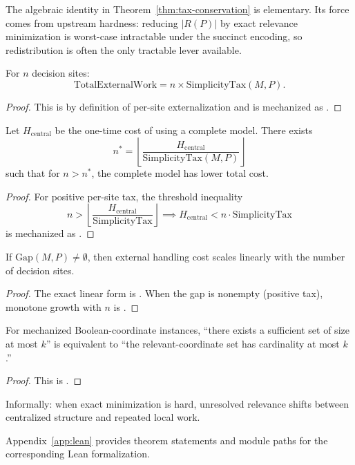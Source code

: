\begin{remark}
The algebraic identity in Theorem~\ref{thm:tax-conservation} is elementary. Its force comes from upstream hardness: reducing $|R(P)|$ by exact relevance minimization is worst-case intractable under the succinct encoding, so redistribution is often the only tractable lever available.
\end{remark}

\begin{theorem}\label{thm:tax-grows}
For $n$ decision sites:
\[
\text{TotalExternalWork} = n \times \text{SimplicityTax}(M, P).
\]
\end{theorem}

\begin{proof}
This is by definition of per-site externalization and is mechanized as
.
\end{proof}

\begin{theorem}[Amortization]\label{thm:amortization}
Let $H_{\text{central}}$ be the one-time cost of using a complete model. There exists
\[
n^* = \left\lfloor \frac{H_{\text{central}}}{\text{SimplicityTax}(M,P)} \right\rfloor
\]
such that for $n > n^*$, the complete model has lower total cost.
\end{theorem}

\begin{proof}
For positive per-site tax, the threshold inequality
\[
n > \left\lfloor \frac{H_{\text{central}}}{\text{SimplicityTax}} \right\rfloor
\implies
H_{\text{central}} < n\cdot \text{SimplicityTax}
\]
is mechanized as
.
\end{proof}

\begin{corollary}\label{cor:gap-externalization}
If $\text{Gap}(M,P)\neq\emptyset$, then external handling cost scales linearly with the number of decision sites.
\end{corollary}

\begin{proof}
The exact linear form is
.
When the gap is nonempty (positive tax), monotone growth with $n$ is
.
\end{proof}

\begin{corollary}\label{cor:gap-minimization-hard}
For mechanized Boolean-coordinate instances, ``there exists a sufficient set of size at most $k$'' is equivalent to ``the relevant-coordinate set has cardinality at most $k$.''
\end{corollary}

\begin{proof}
This is .
\end{proof}

Informally: when exact minimization is hard, unresolved relevance shifts between centralized structure and repeated local work.

Appendix~\ref{app:lean} provides theorem statements and module paths for the corresponding Lean formalization.
